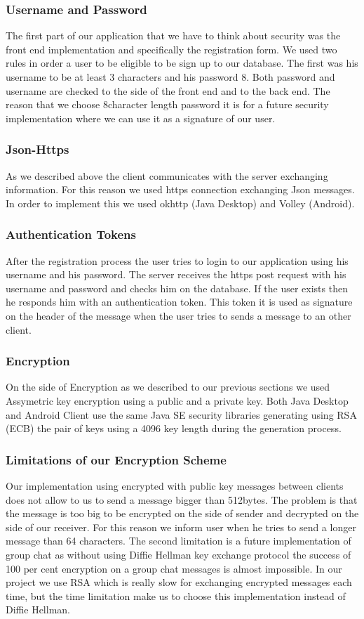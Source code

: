 \documentclass[11pt,a4paper]{report}
\begin{document}
\subsubsection{Username and Password}
The first part of our application that we have to think about security was the front end implementation and specifically the registration form. We used two rules in order a user to be eligible to be sign up to our database. The first was his username to be at least 3 characters and his password 8. Both password and username are checked to the side of the front end and to the back end. The reason that we choose 8character length password it is for a future security implementation where we can use it as a signature of our user.
\subsubsection{Json-Https}
As we described above the client communicates with the server exchanging information. For this reason we used https connection exchanging Json messages. In order to implement this we used okhttp (Java Desktop) and Volley (Android).
\subsubsection{Authentication Tokens}
After the registration process the user tries to login to our application using his username and his password. The server receives the https post request with his username and password and checks him on the database. If the user exists then he responds him with an authentication token. This token it is used as signature on the header of the message when the user tries to sends a message to an other client.
\subsubsection{Encryption}
On the side of Encryption as we described to our previous sections we used Assymetric key encryption using a public and a private key. Both Java Desktop and Android Client use the same Java SE security libraries generating using RSA (ECB) the pair of keys using a 4096 key length during the generation process.
\subsubsection{Limitations of our Encryption Scheme}
Our implementation using encrypted with public key messages between clients does not allow to us to send a message bigger than 512bytes. The problem is that the message is too big to be encrypted on the side of sender and decrypted on the side of our receiver. For this reason we inform user when he tries to send a longer message than 64 characters. The second limitation is a future implementation of group chat as without using  Diffie Hellman key exchange protocol the success of 100 per cent encryption on a group chat messages is almost impossible. In our project we use RSA which is really slow for exchanging encrypted messages each time, but the time limitation make us to choose this implementation instead of Diffie Hellman.
\end{document}
